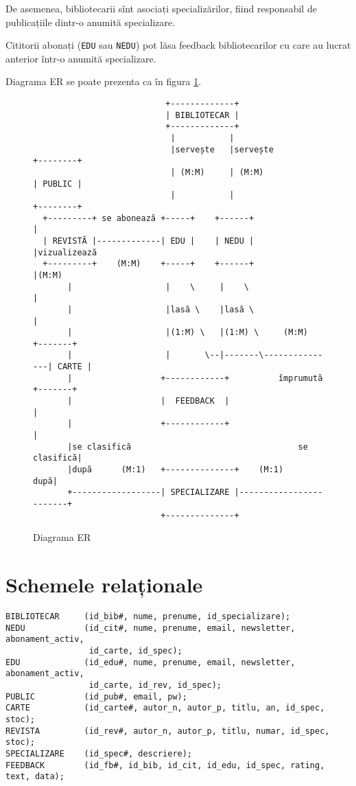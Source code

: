 De asemenea, bibliotecarii sînt asociați specializărilor, fiind
responsabil de publicațiile dintr-o anumită specializare.

Cititorii abonați (\texttt{EDU} sau \texttt{NEDU}) pot lăsa feedback
bibliotecarilor cu care au lucrat anterior într-o anumită specializare.

Diagrama ER se poate prezenta ca în figura \ref{fig:erd}.
\begin{figure}[!htbp]
    \small
    \begin{verbatim}
                           +-------------+
                           | BIBLIOTECAR |
                           +-------------+
                            |           |
                            |servește   |servește              +--------+ 
                            | (M:M)     | (M:M)                | PUBLIC |
                            |           |                      +--------+
  +---------+ se abonează +-----+    +------+                      |
  | REVISTĂ |-------------| EDU |    | NEDU |                      |vizualizează
  +---------+    (M:M)    +-----+    +------+                      |(M:M)
       |                   |    \     |    \                       |
       |                   |lasă \    |lasă \                      |
       |                   |(1:M) \   |(1:M) \     (M:M)      +-------+
       |                   |       \--|-------\---------------| CARTE |
       |                  +------------+          împrumută   +-------+
       |                  |  FEEDBACK  |                          |
       |                  +------------+                          |
       |se clasifică                                  se clasifică|
       |după      (M:1)   +--------------+    (M:1)           după|
       +------------------| SPECIALIZARE |------------------------+
                          +--------------+
    \end{verbatim}
    \caption{Diagrama ER}
    \label{fig:erd}
\end{figure}


\section{Schemele relaționale}
\label{sec:scheme-rel}

\begin{verbatim}
BIBLIOTECAR     (id_bib#, nume, prenume, id_specializare);
NEDU            (id_cit#, nume, prenume, email, newsletter, abonament_activ,
                 id_carte, id_spec);
EDU             (id_edu#, nume, prenume, email, newsletter, abonament_activ,
                 id_carte, id_rev, id_spec);
PUBLIC          (id_pub#, email, pw);
CARTE           (id_carte#, autor_n, autor_p, titlu, an, id_spec, stoc);
REVISTA         (id_rev#, autor_n, autor_p, titlu, numar, id_spec, stoc);
SPECIALIZARE    (id_spec#, descriere);
FEEDBACK        (id_fb#, id_bib, id_cit, id_edu, id_spec, rating, text, data);
\end{verbatim}

